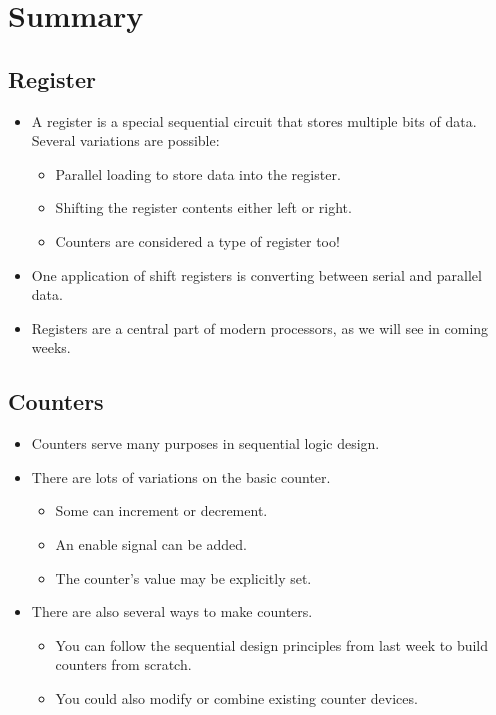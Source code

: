 \section{Summary}

\subsection{Register}

\begin{itemize}
  \item A register is a special sequential circuit that stores multiple bits of data. Several variations are possible:
    \begin{itemize}
      \item Parallel loading to store data into the register.
      \item Shifting the register contents either left or right.
      \item Counters are considered a type of register too!
    \end{itemize}
  
  \item One application of shift registers is converting between serial and parallel data.
  \item Registers are a central part of modern processors, as we will see in coming weeks.
\end{itemize}

\subsection{Counters}

\begin{itemize}
  \item Counters serve many purposes in sequential logic design.
  \item There are lots of variations on the basic counter.
    \begin{itemize}
      \item Some can increment or decrement.
      \item An enable signal can be added.
      \item The counter's value may be explicitly set.
    \end{itemize}
  
  \item There are also several ways to make counters.
  \begin{itemize}
    \item You can follow the sequential design principles from last week to build counters from scratch.
    \item You could also modify or combine existing counter devices.
  \end{itemize}  
\end{itemize}